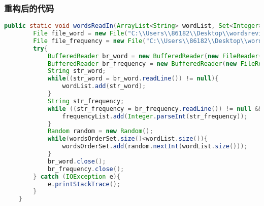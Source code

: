 \documentclass[a4paper]{article}
\begin{document}
\subsubsection*{重构后的代码}
\begin{lstlisting}[language={java}]
    public static void wordsReadIn(ArrayList<String> wordList, Set<Integer> wordsOrderSet, ArrayList<Integer> frequencyList){
        File file_word = new File("C:\\Users\\86182\\Desktop\\wordsreview.txt");
        File file_frequency = new File("C:\\Users\\86182\\Desktop\\wordsFrequency.txt");
        try{
            BufferedReader br_word = new BufferedReader(new FileReader(file_word));
            BufferedReader br_frequency = new BufferedReader(new FileReader(file_frequency));
            String str_word;
            while((str_word = br_word.readLine()) != null){
                wordList.add(str_word);
            }
            String str_frequency;
            while ((str_frequency = br_frequency.readLine()) != null && !str_frequency.equals("")){
                frequencyList.add(Integer.parseInt(str_frequency));
            }
            Random random = new Random();
            while(wordsOrderSet.size()<wordList.size()){
                wordsOrderSet.add(random.nextInt(wordList.size()));
            }
            br_word.close();
            br_frequency.close();
        } catch (IOException e){
            e.printStackTrace();
        }
    }
\end{lstlisting}
\end{document}
